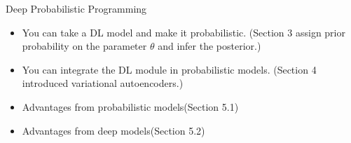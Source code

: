 
\begin{frame}{Deep Probabilistic Programming\cite{tran2017deep}}
    \begin{itemize}
    \item You can take a DL model and make it probabilistic. (Section 3 assign prior probability on the parameter $\theta$ and infer the posterior.)
    \item You can integrate the DL module in probabilistic models. (Section 4 introduced variational autoencoders.)
    \item Advantages from probabilistic models(Section 5.1) 
    \item Advantages from deep models(Section 5.2)
    \end{itemize}
    \end{frame}
    